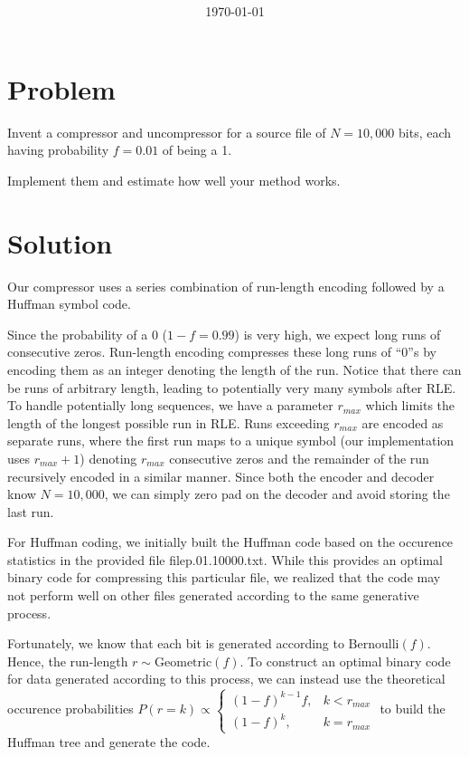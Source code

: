 \documentclass[11pt]{article}
\begin{document}
\title{\coursename\\\assignmentname}
\author{\authorname}
\date{\today}


\section{Problem}
  Invent a compressor and uncompressor for a source file of $N=10,000$ bits,
  each having probability $f = 0.01$ of being a 1.

  Implement them and estimate how well your method works.


\section{Solution}
  Our compressor uses a series combination of run-length encoding followed by a
  Huffman symbol code.

  Since the probability of a $0$ ($1-f = 0.99$) is very high, we expect long
  runs of consecutive zeros. Run-length encoding compresses these long runs of
  ``0''s by encoding them as an integer denoting the length of the run. Notice
  that there can be runs of arbitrary length, leading to potentially very many
  symbols after RLE. To handle potentially long sequences, we have a parameter
  $r_{max}$ which limits the length of the longest possible run in RLE. Runs
  exceeding $r_{max}$ are encoded as separate runs, where the first run
  maps to a unique symbol (our implementation uses $r_{max} +1$) denoting
  $r_{max}$ consecutive zeros and the remainder of the run recursively encoded
  in a similar manner. Since both the encoder and decoder know $N=10,000$, we
  can simply zero pad on the decoder and avoid storing the last run.

  For Huffman coding, we initially built the Huffman code based on the
  occurence statistics in the provided file {filep.01.10000.txt}.
  While this provides an optimal binary code for compressing this particular file,
  we realized that the code may not perform well on other files generated
  according to the same generative process.

  Fortunately, we know that each bit is generated according to
  $\text{Bernoulli}(f)$. Hence, the run-length $r \sim \text{Geometric}(f)$.
  To construct an optimal binary code for data generated according to this
  process, we can instead use the theoretical occurence probabilities $P(r = k) \propto \begin{cases}
    (1-f)^{k-1}f, &k < r_{max}\\
    (1-f)^{k}, &k = r_{max}
  \end{cases}$ to build the Huffman tree and generate the code.
\end{document}
